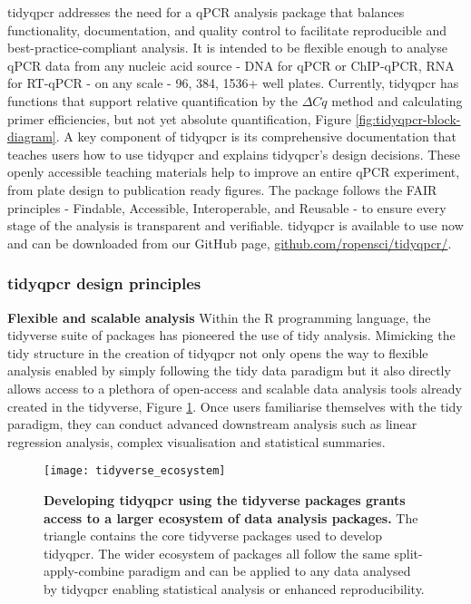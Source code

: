 \documentclass[../main.tex]{subfiles}
\begin{document}
tidyqpcr addresses the need for a qPCR analysis package that balances functionality, documentation, and quality control to facilitate reproducible and best-practice-compliant analysis.
It is intended to be flexible enough to analyse qPCR data from any nucleic acid source - DNA for qPCR or ChIP-qPCR, RNA for RT-qPCR - on any scale - 96, 384, 1536+ well plates.
Currently, tidyqpcr has functions that support relative quantification by the $\Delta Cq$ method and calculating primer efficiencies, but not yet absolute quantification, Figure \ref{fig:tidyqpcr-block-diagram}.
A key component of tidyqpcr is its comprehensive documentation that teaches users how to use tidyqpcr and explains tidyqpcr’s design decisions.
These openly accessible teaching materials help to improve an entire qPCR experiment, from plate design to publication ready figures.
The package follows the FAIR principles - Findable, Accessible, Interoperable, and Reusable - to ensure every stage of the analysis is transparent and verifiable. 
tidyqpcr is available to use now and can be downloaded from our GitHub page, \href{https://github.com/ropensci/tidyqpcr/}{github.com/ropensci/tidyqpcr/}.


\subsubsection{tidyqpcr design principles}


\textbf{Flexible and scalable analysis} Within the R programming language, the tidyverse suite of packages has pioneered the use of tidy analysis. 
Mimicking the tidy structure in the creation of tidyqpcr not only opens the way to flexible analysis enabled by simply following the tidy data paradigm but it also directly allows access to a plethora of open-access and scalable data analysis tools already created in the tidyverse, Figure \ref{fig:tidyverse-ecosystem}. 
Once users familiarise themselves with the tidy paradigm, they can conduct advanced downstream analysis such as linear regression analysis, complex visualisation and statistical summaries. 

\begin{figure}[t]

{\centering \texttt{[image: tidyverse\_ecosystem]} 

}

\caption[Developing tidyqpcr using the tidyverse packages grants access to a larger ecosystem of data analysis packages.]{\textbf{Developing tidyqpcr using the tidyverse packages grants access to a larger ecosystem of data analysis packages.} The triangle contains the core tidyverse packages used to develop tidyqpcr. The wider ecosystem of packages all follow the same split-apply-combine paradigm and can be applied to any data analysed by tidyqpcr enabling statistical analysis or enhanced reproducibility.}\label{fig:tidyverse-ecosystem}
\end{figure}
\end{document}
